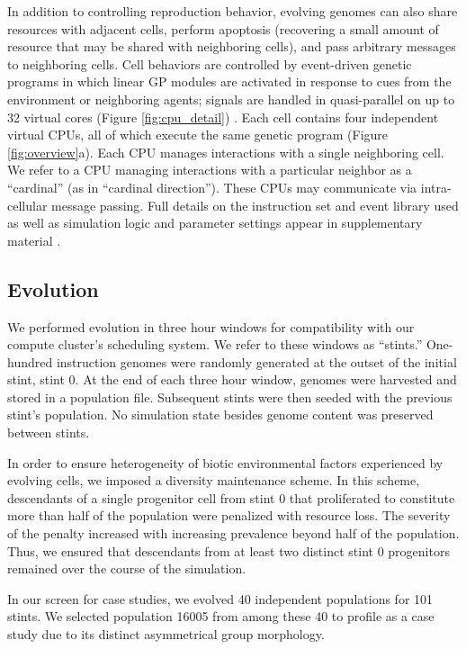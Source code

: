 In addition to controlling reproduction behavior, evolving genomes can also share resources with adjacent cells, perform apoptosis (recovering a small amount of resource that may be shared with neighboring cells), and pass arbitrary messages to neighboring cells.
Cell behaviors are controlled by event-driven genetic programs in which linear GP modules are activated in response to cues from the environment or neighboring agents; signals are handled in quasi-parallel on up to 32 virtual cores (Figure \ref{fig:cpu_detail}) \citep{lalejini2018evolving}.
Each cell contains four independent virtual CPUs, all of which execute the same genetic program (Figure \ref{fig:overview}a).
Each CPU manages interactions with a single neighboring cell.
We refer to a CPU managing interactions with a particular neighbor as a ``cardinal'' (as in ``cardinal direction'').
These CPUs may communicate via intra-cellular message passing.
Full details on the instruction set and event library used as well as simulation logic and parameter settings appear in supplementary material \citep{Moreno_2021}.

\subsection{Evolution}

We performed evolution in three hour windows for compatibility with our compute cluster's scheduling system.
We refer to these windows as ``stints.''
One-hundred instruction genomes were randomly generated at the outset of the initial stint, stint 0.
At the end of each three hour window, genomes were harvested and stored in a population file.
Subsequent stints were then seeded with the previous stint's population.
No simulation state besides genome content was preserved between stints.

In order to ensure heterogeneity of biotic environmental factors experienced by evolving cells, we imposed a diversity maintenance scheme.
In this scheme, descendants of a single progenitor cell from stint 0 that proliferated to constitute more than half of the population were penalized with resource loss.
The severity of the penalty increased with increasing prevalence beyond half of the population.
Thus, we ensured that descendants from at least two distinct stint 0 progenitors remained over the course of the simulation.

In our screen for case studies, we evolved 40 independent populations for 101 stints.
We selected population 16005 from among these 40 to profile as a case study due to its distinct asymmetrical group morphology.

